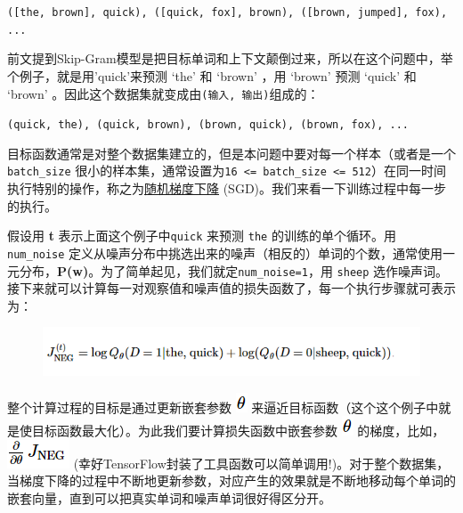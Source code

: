 \texttt{({[}the,\ brown{]},\ quick),\ ({[}quick,\ fox{]},\ brown),\ ({[}brown,\ jumped{]},\ fox),\ ...}

前文提到Skip-Gram模型是把目标单词和上下文颠倒过来，所以在这个问题中，举个例子，就是用'quick'来预测
`the' 和 `brown' ，用 `brown' 预测 `quick' 和 `brown'
。因此这个数据集就变成由\texttt{(输入,\ 输出)}组成的：

\texttt{(quick,\ the),\ (quick,\ brown),\ (brown,\ quick),\ (brown,\ fox),\ ...}

目标函数通常是对整个数据集建立的，但是本问题中要对每一个样本（或者是一个\texttt{batch\_size}
很小的样本集，通常设置为\texttt{16\ \textless{}=\ batch\_size\ \textless{}=\ 512}）在同一时间执行特别的操作，称之为\href{https://en.wikipedia.org/wiki/Stochastic_gradient_descent}{随机梯度下降}
(SGD)。我们来看一下训练过程中每一步的执行。

假设用 \textbf{t} 表示上面这个例子中\texttt{quick} 来预测 \texttt{the}
的训练的单个循环。用 \texttt{num\_noise}
定义从噪声分布中挑选出来的噪声（相反的）单词的个数，通常使用一元分布，\textbf{P(w)}。为了简单起见，我们就定\texttt{num\_noise=1}，用
\texttt{sheep}
选作噪声词。接下来就可以计算每一对观察值和噪声值的损失函数了，每一个执行步骤就可表示为：

\begin{figure}[htbp]
\centering
\includegraphics{../SOURCE/images/vr4.png}
\caption{}
\end{figure}

整个计算过程的目标是通过更新嵌套参数
\includegraphics{../SOURCE/images/theta.png}
来逼近目标函数（这个这个例子中就是使目标函数最大化）。为此我们要计算损失函数中嵌套参数
\includegraphics{../SOURCE/images/theta.png} 的梯度，比如，
\includegraphics{../SOURCE/images/vr5.png}
(幸好TensorFlow封装了工具函数可以简单调用!)。对于整个数据集，当梯度下降的过程中不断地更新参数，对应产生的效果就是不断地移动每个单词的嵌套向量，直到可以把真实单词和噪声单词很好得区分开。

